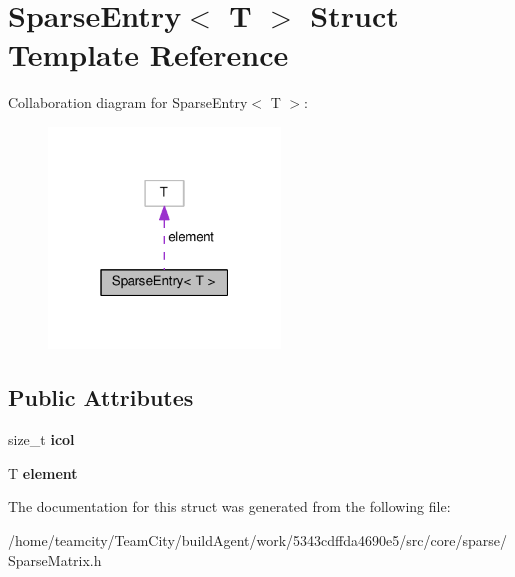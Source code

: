 \hypertarget{structSparseEntry}{}\section{Sparse\+Entry$<$ T $>$ Struct Template Reference}
\label{structSparseEntry}


Collaboration diagram for Sparse\+Entry$<$ T $>$\+:
\nopagebreak
\begin{figure}[H]
\begin{center}
\leavevmode
\includegraphics[width=175pt]{structSparseEntry__coll__graph}
\end{center}
\end{figure}
\subsection*{Public Attributes}
\begin{DoxyCompactItemize}
\item 
size\+\_\+t {\bfseries icol}\hypertarget{structSparseEntry_a4d2f28eb765872b70a420f16394eb2f4}{}\label{structSparseEntry_a4d2f28eb765872b70a420f16394eb2f4}

\item 
T {\bfseries element}\hypertarget{structSparseEntry_a9dec94fc6dfd9a4f0d5f46b85fb885ba}{}\label{structSparseEntry_a9dec94fc6dfd9a4f0d5f46b85fb885ba}

\end{DoxyCompactItemize}


The documentation for this struct was generated from the following file\+:\begin{DoxyCompactItemize}
\item 
/home/teamcity/\+Team\+City/build\+Agent/work/5343cdffda4690e5/src/core/sparse/Sparse\+Matrix.\+h\end{DoxyCompactItemize}

